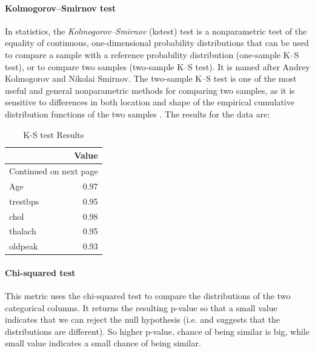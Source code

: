 \documentclass{article}
\begin{document}
\paragraph{Kolmogorov–Smirnov test}
In statistics, the \textit{Kolmogorov–Smirnov} (\acrshort{kstest}) test is a nonparametric test of the equality of continuous, one-dimensional probability distributions that can be used to compare a sample with a reference probability distribution (one-sample K–S test), or to compare two samples (two-sample K–S test). It is named after Andrey Kolmogorov and Nikolai Smirnov. 
The two-sample K–S test is one of the most useful and general nonparametric methods for comparing two samples, as it is sensitive to differences in both location and shape of the empirical cumulative distribution functions of the two samples \cite{kstest_wiki}.  The results for the data are:\\

\begin{longtable}{lr}
\caption{K-S test Results}\label{tab:ks}\\
\toprule
{} & Value \\
\midrule
\endhead
\midrule
\multicolumn{2}{r}{{Continued on next page}} \\
\midrule
\endfoot

\bottomrule
\endlastfoot
Age      &  0.97 \\
trestbps &  0.95 \\
chol     &  0.98 \\
thalach  &  0.95 \\
oldpeak  &  0.93 \\
\end{longtable}



\paragraph{Chi-squared test}
This metric uses the chi-squared test to compare the distributions of the two categorical columns. It returns the resulting p-value so that a small value indicates that we can reject the null hypothesis (i.e. and suggests that the distributions are different). So higher p-value, chance of being similar is big, while small value indicates a small chance of being similar.\\
\end{document}
